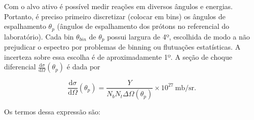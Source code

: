 \documentclass[a4paper,12pt,oneside]{book}
\begin{document}
\par Com o alvo ativo é possível medir reações em diversos ângulos e energias. Portanto, é preciso primeiro discretizar (colocar em bins) os ângulos de espalhamento $\theta_p$ (ângulos de espalhamento dos prótons no referencial do laboratório). Cada bin $\theta_{bin}$ de $\theta_p$ possui largura de 4º, escolhida de modo a não prejudicar o espectro por problemas de binning ou flutuações estatísticas. A incerteza sobre essa escolha é de aproximadamente 1º. A seção de choque diferencial $\frac{\mathrm{d}\sigma}{\mathrm{d}\Omega} (\theta_p)$ é dada por \cite{zamora_mater}

\begin{equation}\label{eq:cross_section}
	\frac{\mathrm{d}\sigma}{\mathrm{d}\Omega} (\theta_p) = \frac{Y}{N_bN_t\Delta\Omega(\theta_p)}\times 10^{27} \:  \mathrm{mb/sr}.
\end{equation}

\par Os termos dessa expressão são:
\end{document}
